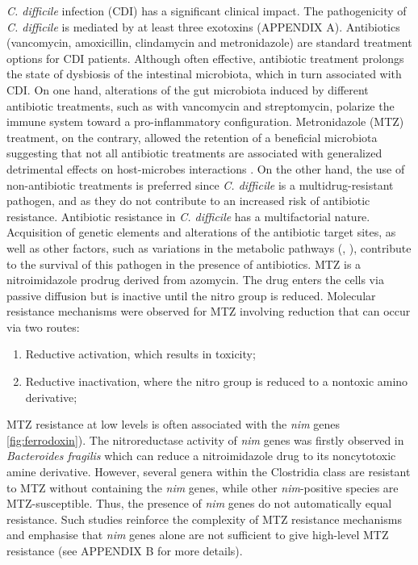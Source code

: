 \documentclass{article}
\begin{document}
{\it C. difficile} infection (CDI) has a significant clinical impact. The pathogenicity of {\it C. difficile} is mediated by at least three exotoxins (APPENDIX A). Antibiotics (vancomycin, amoxicillin, clindamycin and metronidazole) are standard treatment options for CDI patients. Although often effective, antibiotic treatment prolongs the state of dysbiosis of the intestinal microbiota, which in turn associated with CDI. On one hand, alterations of the gut microbiota induced by different antibiotic treatments, such as with vancomycin and streptomycin, polarize the immune system toward a pro-inflammatory configuration. Metronidazole (MTZ) treatment, on the contrary, allowed the retention of a beneficial microbiota suggesting that not all antibiotic treatments are associated with generalized detrimental effects on host-microbes interactions \cite{Strati}. On the other hand, the use of non-antibiotic treatments is preferred since {\it C. difficile} is a multidrug-resistant pathogen, and as they do not contribute to an increased risk of antibiotic resistance.
Antibiotic resistance in {\it C. difficile} has a multifactorial nature. Acquisition of genetic elements and alterations of the antibiotic target sites, as well as other factors, such as variations in the metabolic pathways (\cite{Chong}, \cite{Moura}), contribute to the survival of this pathogen in the presence of antibiotics. MTZ is a nitroimidazole prodrug derived from azomycin. The drug enters the cells via passive diffusion but is inactive until the nitro group is reduced. Molecular resistance mechanisms were observed for MTZ involving reduction that can occur via two routes:

\begin{enumerate}
\item Reductive activation, which results in toxicity;
\item Reductive inactivation, where the nitro group is reduced to a nontoxic amino derivative;
\end{enumerate}

MTZ resistance at low levels is often associated with the {\it nim} genes \ref{fig:ferrodoxin}). The nitroreductase activity of {\it nim} genes was firstly observed in {\it Bacteroides fragilis} which can reduce a nitroimidazole drug to its noncytotoxic amine derivative. However, several genera within the Clostridia class are resistant to MTZ without containing the {\it nim} genes, while other {\it nim}-positive species are MTZ-susceptible. Thus, the presence of {\it nim} genes do not automatically equal resistance. Such studies reinforce the complexity of MTZ resistance mechanisms and emphasise that {\it nim} genes alone are not sufficient to give high-level MTZ resistance \cite{Thomas} (see APPENDIX B for more details).
\end{document}
